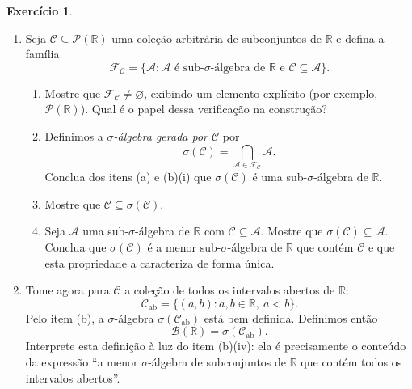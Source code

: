 \documentclass[12pt,portuguese]{article}
\theoremstyle{definition}
\theoremstyle{plainexercise}
\newtheorem{exercise}{Exercício}
\theoremstyle{starredexercise}
\theoremstyle{definition}
\let\emptyset\varnothing
\begin{document}
\begin{exercise}
\begin{enumerate}[label=\textbf{(\alph*)}, leftmargin=*, itemsep=0.6em]
    \item Seja $\mathcal{C} \subseteq \mathscr{P}(\mathbb{R})$ uma
    coleção arbitrária de subconjuntos de $\mathbb{R}$ e defina a família
    \[
      \mathcal{F}_{\mathcal{C}}
      = \bigl\{\mathcal{A} : \mathcal{A} \text{ é sub-$\sigma$-álgebra de }
        \mathbb{R} \text{ e } \mathcal{C} \subseteq \mathcal{A}\bigr\}.
    \]
    \begin{enumerate}[label=(\roman*)]
      \item Mostre que $\mathcal{F}_{\mathcal{C}} \neq \emptyset$, exibindo um
        elemento explícito (por exemplo, $\mathscr{P}(\mathbb{R})$).
        Qual é o papel dessa verificação na construção?
      \item Definimos a \emph{$\sigma$-álgebra gerada por $\mathcal{C}$} por
        \[
          \sigma(\mathcal{C})
          = \bigcap_{\mathcal{A} \in \mathcal{F}_{\mathcal{C}}} \mathcal{A}.
        \]
        Conclua dos itens (a) e (b)(i) que $\sigma(\mathcal{C})$ é uma
        sub-$\sigma$-álgebra de $\mathbb{R}$.
      \item Mostre que $\mathcal{C} \subseteq \sigma(\mathcal{C})$.
      \item Seja $\mathcal{A}$ uma
        sub-$\sigma$-álgebra de $\mathbb{R}$ com $\mathcal{C} \subseteq
        \mathcal{A}$. Mostre que $\sigma(\mathcal{C}) \subseteq \mathcal{A}$. Conclua que
        $\sigma(\mathcal{C})$ é a menor sub-$\sigma$-álgebra de $\mathbb{R}$
        que contém $\mathcal{C}$ e que esta propriedade a caracteriza de forma
        única.
    \end{enumerate}

    \item Tome agora para $\mathcal{C}$
    a coleção de todos os intervalos abertos de $\mathbb{R}$:
    \[
      \mathcal{C}_{\text{ab}}
      = \bigl\{(a,b) : a, b \in \mathbb{R},\ a < b\bigr\}.
    \]
    Pelo item (b), a $\sigma$-álgebra $\sigma(\mathcal{C}_{\text{ab}})$ está
    bem definida. Definimos então
    \[
      \mathscr{B}(\mathbb{R}) = \sigma(\mathcal{C}_{\text{ab}}).
    \]
    Interprete esta definição à luz do item (b)(iv): ela é precisamente o
    conteúdo da expressão ``a menor $\sigma$-álgebra de subconjuntos de
    $\mathbb{R}$ que contém todos os intervalos abertos''.


\end{enumerate}
\end{exercise}
\end{document}
